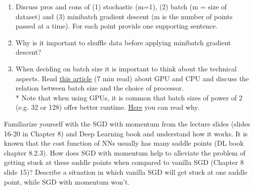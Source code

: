 \begin{solution}
\end{solution}

\pagebreak
\begin{exercise}

\begin{enumerate}

	\item Discuss pros and cons of (1) stochastic (m=1), (2) batch (m = size of dataset) and (3) minibatch gradient descent (m is the number of points passed at a time).
	For each point provide one supporting sentence.
	\item Why is it important to shuffle data before applying minibatch gradient descent?
	\item When deciding on batch size it is important to think about the technical aspects.
	Read \href{https://cutt.ly/0jvF1Ww}{this article} (7 min read) about GPU and CPU and discuss the relation between batch size and the choice of processor. \\
	* Note that when using GPUs, it is common that batch sizes of power of 2 (e.g. 32 or 128) offer better runtime. \href{https://datascience.stackexchange.com/questions/20179/what-is-the-advantage-of-keeping-batch-size-a-power-of-2}{Here} you can read why.

\end{enumerate}

\end{exercise}


\begin{solution}
\end{solution}

\begin{exercise}
Familiarize yourself with the SGD with momentum from the lecture slides (slides 16-20 in Chapter 8) and Deep Learning book and understand how it works. It is known that the cost function of NNs usually has many saddle points (DL
book chapter 8.2.3). How does SGD with momentum help to alleviate the problem of getting stuck at these saddle points when compared to vanilla SGD (Chapter 8 slide
15)? Describe a situation in which vanilla SGD will get stuck at one saddle point, while SGD with momentum won’t.

\end{exercise}

\begin{solution}
\end{solution}


